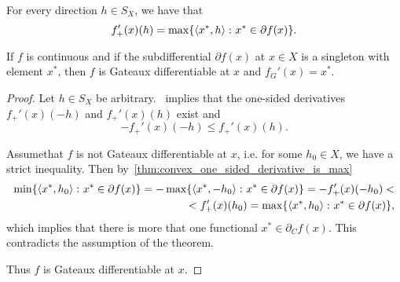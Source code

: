 \begin{proposition}
  \label{thm:convex_one_sided_derivative_is_max}
  For every direction \( h \in S_X \), we have that
  \begin{equation*}
    f_+'(x)(h) = \max\{ \left\langle x^*, h \right\rangle \colon x^* \in \partial f(x) \}.
  \end{equation*}
\end{proposition}

\begin{theorem}\label{thm:singleton_subdifferential_implies_gateaux}
  If \( f \) is continuous and if the subdifferential \( \partial f(x) \) at \( x \in X \) is a singleton with element \( x^* \), then \( f \) is Gateaux differentiable at \( x \) and \( f_G'(x) = x^* \).
\end{theorem}
\begin{proof}
  Let \( h \in S_X \) be arbitrary.~ implies that the one-sided derivatives \( f_+'(x)(-h) \) and \( f_+'(x)(h) \) exist and
  \begin{equation*}
    -f_+'(x)(-h) \leq f_+'(x)(h).
  \end{equation*}

  Assume\LEM that \( f \) is not Gateaux differentiable at \( x \), i.e. for some \( h_0 \in X \), we have a strict inequality. Then by~\cref{thm:convex_one_sided_derivative_is_max}
  \begin{align*}
    \min\{ \left\langle x^*, h_0 \right\rangle \colon x^* \in \partial f(x) \}
    =
    -\max\{ \left\langle x^*, -h_0 \right\rangle \colon x^* \in \partial f(x) \}
    =
    -f_+'(x)(-h_0)
    < \\ <
    f_+'(x)(h_0)
    =
    \max\{ \left\langle x^*, h_0 \right\rangle \colon x^* \in \partial f(x) \},
  \end{align*}
  which implies that there is more that one functional \( x^* \in \partial_C f(x) \). This contradicts the assumption of the theorem.

  Thus \( f \) is Gateaux differentiable at \( x \).
\end{proof}

